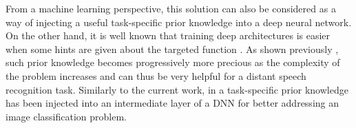\documentclass{article}
\begin{document}
From a machine learning perspective, this solution can also be considered as a way of injecting a useful task-specific prior knowledge into a deep neural network.
On the other hand, it is well known that training deep architectures is easier when some hints are given about the targeted function \cite{know_matter}. %
As shown previously \cite{know_matter}, such prior knowledge becomes progressively more precious as the complexity of the problem increases and can thus be very helpful for a distant speech recognition task. Similarly to the current work, in \cite{know_matter,Romero-et-al-ICLR2015-small} a task-specific prior knowledge has been injected into an intermediate layer of a DNN for better addressing an image classification problem.
\end{document}
